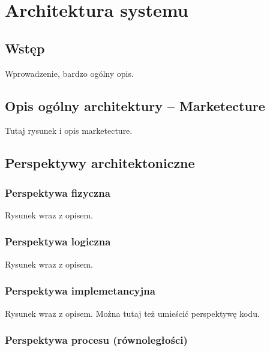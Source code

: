 \chapter{Architektura systemu}
\label{Chapter5}

\section{Wstęp}
\label{Chapter51}

Wprowadzenie, bardzo ogólny opis. 

\section{Opis ogólny architektury -- Marketecture}
\label{Chapter52}

Tutaj rysunek i opis marketecture.

%
%
\section{Perspektywy architektoniczne}
\label{Chapter54}

\subsection{Perspektywa fizyczna}

Rysunek wraz z opisem.

\subsection{Perspektywa logiczna}

Rysunek wraz z opisem.

\subsection{Perspektywa implemetancyjna}

Rysunek wraz z opisem. Można tutaj też umieścić perspektywę kodu.

\subsection{Perspektywa procesu (równoległości)}

